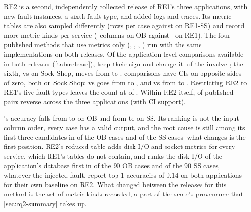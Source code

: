 RE2 is a second, independently collected release of RE1's three applications, with new fault instances, a sixth fault type, and added logs and traces.
Its metric tables are also sampled differently (\ReTwoRows rows per case against \ReOneSSRows on RE1-SS) and record more metric kinds per service (\ReTwoOBColsMin--\ReTwoOBColsMax columns on OB against \ReOneOBColsMin--\ReOneOBColsMax on RE1).
The four published methods that use metrics only (\baro, \circa, \ediag, \causalrca) run with the same implementations on both releases.
Of the \NCrossPub application-level comparisons available in both releases (\cref{tab:release}), \NCrossPubAgree keep their sign and \NCrossPubChange change it.
\NCrossPubChangeBaro of the \NCrossPubChange involve \baro; the sixth, \causalrca vs \ediag on Sock Shop, moves from \CrossCrEdSSOne \CrossCrEdSSOneCI to \CrossCrEdSSTwo \CrossCrEdSSTwoCI.
\NCrossPubCIopp comparisons have CIs on opposite sides of zero, both on Sock Shop: \baro vs \circa goes from \CrossBaroCircaSSOne \CrossBaroCircaSSOneCI to \CrossBaroCircaSSTwo \CrossBaroCircaSSTwoCI, and \baro vs \causalrca from \CrossBaroCrSSOne to \CrossBaroCrSSTwo \CrossBaroCrSSTwoCI.
Restricting RE2 to RE1's five fault types leaves the count at \NCrossPubAgreeReOneFaults of \NCrossPub.
Within RE2 itself, \NReTwoPubRev of \NReTwoPubPairs published pairs reverse across the three applications (\NReTwoPubRevCI with CI support).

\baro's accuracy falls from \BaroAccReOneOB to \BaroAccReTwoOB on OB and from \BaroAccReOneSS to \BaroAccReTwoSS on SS.
Its ranking is not the input column order, every case has a valid output, and the root cause is still among its first three candidates in \BaroReTwoOBAccThree of the OB cases and \BaroReTwoSSAccThree of the SS cases; what changes is the first position.
RE2's reduced table adds disk I/O and socket metrics for every service, which RE1's tables do not contain, and \baro ranks the disk I/O of the application's database first in \BaroReTwoOBTopMetricN of the 90 OB cases and \BaroReTwoSSTopMetricN of the 90 SS cases, whatever the injected fault.
\citet{fang2025simplerca} report top-1 accuracies of 0.14 on both applications for their own \baro baseline on RE2.
What changed between the releases for this method is the set of metric kinds recorded, a part of the score's provenance that \cref{sec:rq2-summary} takes up.

\begin{table}[t]
\caption{Same application, two releases: subsystem differences $\Delta_s$ ($A$ minus $B$) between published methods on RE1 and RE2. Bold: the two releases' 95\% CIs lie on opposite sides of zero.}
\label{tab:release}
\footnotesize

\end{table}

